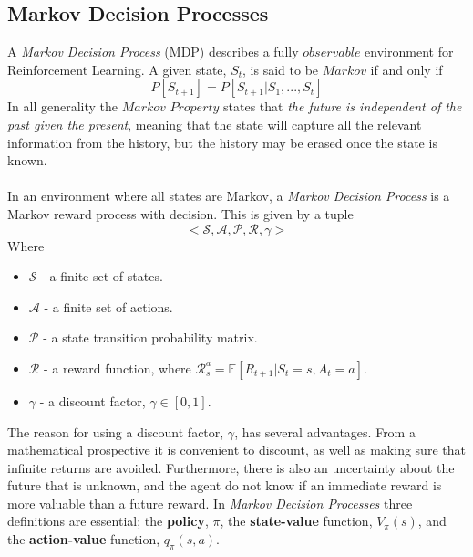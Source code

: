 \subsection{Markov Decision Processes}
A \textit{Markov Decision Process} (MDP) describes a fully $observable$ environment for Reinforcement Learning. A given state, $S_{t}$, is said to be $Markov$ if and only if
\begin{equation}
    P[S_{t+1}] = P[S_{t+1} | S_{1},...,S_{t}]
\end{equation}
In all generality the $\textit{Markov Property}$ states that \textit{the future is independent of the past given the present}, meaning that the state will capture all the relevant information from the history, but the history may be erased once the state is known.\\\\
In an environment where all states are Markov, a \textit{Markov Decision Process} is a Markov reward process with decision. This is given by a tuple $$<\mathcal{S, A, P, R, \gamma}>$$Where
\begin{itemize}
    \item $\mathcal{S}$ - a finite set of states.
    \item $\mathcal{A}$ - a finite set of actions.
    \item $\mathcal{P}$ - a state transition probability matrix.
    \item $\mathcal{R}$ - a reward function, where $\mathcal{R}^{a}_{s} = \mathbb{E}[R_{t+1}|S_{t}=s, A_{t} = a]$.
    \item $\mathcal{\gamma}$ - a discount factor, $\gamma \in [0, 1]$.
\end{itemize}
The reason for using a discount factor, $\mathcal{\gamma}$, has several advantages. From a mathematical prospective it is convenient to discount, as well as making sure that infinite returns are avoided. Furthermore, there is also an uncertainty about the future that is unknown, and the agent do not know if an immediate reward is more valuable than a future reward. In \textit{Markov Decision Processes} three definitions are essential; the \textbf{policy}, $\pi$, the \textbf{state-value} function, $V_{\pi}(s)$, and the \textbf{action-value} function, $q_{\pi}(s,a)$. 
